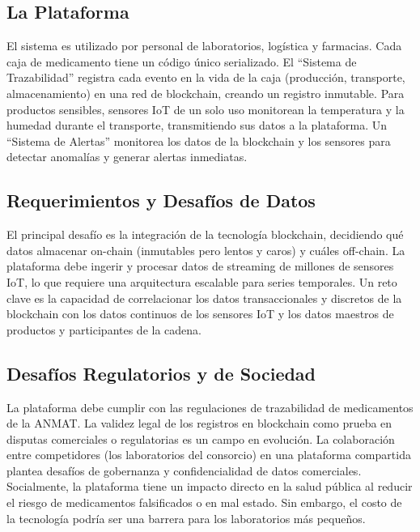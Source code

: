 \documentclass[12pt]{article}
\begin{document}
\subsection{La Plataforma}
El sistema es utilizado por personal de laboratorios, logística y farmacias. Cada caja de medicamento tiene un código único serializado. El ``Sistema de Trazabilidad'' registra cada evento en la vida de la caja (producción, transporte, almacenamiento) en una red de blockchain, creando un registro inmutable. Para productos sensibles, sensores IoT de un solo uso monitorean la temperatura y la humedad durante el transporte, transmitiendo sus datos a la plataforma. Un ``Sistema de Alertas'' monitorea los datos de la blockchain y los sensores para detectar anomalías y generar alertas inmediatas.

\subsection{Requerimientos y Desafíos de Datos}
El principal desafío es la integración de la tecnología blockchain, decidiendo qué datos almacenar on-chain (inmutables pero lentos y caros) y cuáles off-chain. La plataforma debe ingerir y procesar datos de streaming de millones de sensores IoT, lo que requiere una arquitectura escalable para series temporales. Un reto clave es la capacidad de correlacionar los datos transaccionales y discretos de la blockchain con los datos continuos de los sensores IoT y los datos maestros de productos y participantes de la cadena.

\subsection{Desafíos Regulatorios y de Sociedad}
La plataforma debe cumplir con las regulaciones de trazabilidad de medicamentos de la ANMAT. La validez legal de los registros en blockchain como prueba en disputas comerciales o regulatorias es un campo en evolución. La colaboración entre competidores (los laboratorios del consorcio) en una plataforma compartida plantea desafíos de gobernanza y confidencialidad de datos comerciales. Socialmente, la plataforma tiene un impacto directo en la salud pública al reducir el riesgo de medicamentos falsificados o en mal estado. Sin embargo, el costo de la tecnología podría ser una barrera para los laboratorios más pequeños.
\end{document}
